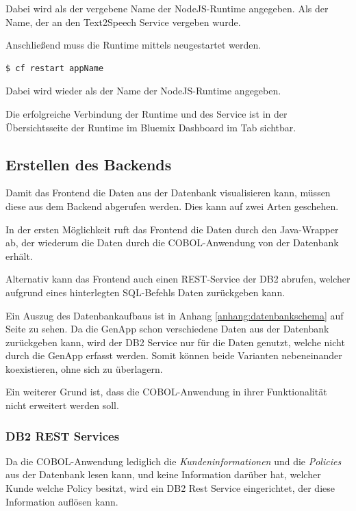 Dabei wird als  der vergebene Name der NodeJS-Runtime angegeben. Als  der Name, der an den
Text2Speech Service vergeben wurde.

Anschließend muss die Runtime mittels  neugestartet werden.

\begin{lstlisting}[language=bash, caption=Neustarten der Runtime, label=Neustarten der Runtime]
   $ cf restart appName
\end{lstlisting}

Dabei wird wieder als  der Name der NodeJS-Runtime angegeben.

Die erfolgreiche Verbindung der Runtime und des Service ist in der Übersichtsseite der Runtime im Bluemix Dashboard im
Tab  sichtbar.

\subsection{Erstellen des Backends}
Damit das Frontend die Daten aus der Datenbank visualisieren kann, müssen diese aus dem Backend abgerufen werden. Dies kann
auf zwei Arten geschehen.

In der ersten Möglichkeit ruft das Frontend die Daten durch den Java-Wrapper ab, der wiederum die Daten durch die
COBOL-Anwendung von der Datenbank erhält.

Alternativ kann das Frontend auch einen REST-Service der DB2 abrufen, welcher aufgrund eines hinterlegten SQL-Befehls
Daten zurückgeben kann.

Ein Auszug des Datenbankaufbaus ist in Anhang \ref{anhang:datenbankschema} auf Seite \pageref{anhang:datenbankschema}
zu sehen. Da die GenApp schon verschiedene Daten aus der Datenbank zurückgeben kann, wird der DB2 Service nur für die
Daten genutzt, welche nicht durch die GenApp erfasst werden. Somit können beide Varianten nebeneinander koexistieren, ohne
sich zu überlagern.

Ein weiterer Grund ist, dass die COBOL-Anwendung in ihrer Funktionalität nicht erweitert werden soll.

\subsubsection{DB2 REST Services}
Da die COBOL-Anwendung lediglich die \textit{Kundeninformationen} und die \textit{Policies} aus der Datenbank lesen kann,
und keine Information darüber hat, welcher Kunde welche Policy besitzt, wird ein DB2 Rest Service eingerichtet, der diese
Information auflösen kann.


